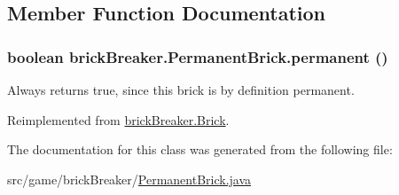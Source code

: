 \subsection{Member Function Documentation}
\hypertarget{classbrick_breaker_1_1_permanent_brick_a5095518bc2226f3257202d99e37d8ae4}{
\subsubsection[{permanent}]{\setlength{\rightskip}{0pt plus 5cm}boolean brickBreaker.PermanentBrick.permanent ()}}
\label{classbrick_breaker_1_1_permanent_brick_a5095518bc2226f3257202d99e37d8ae4}
Always returns true, since this brick is by definition permanent. 

Reimplemented from \hyperlink{classbrick_breaker_1_1_brick_a5fa03da94163b3dc3707c030e85a1405}{brickBreaker.Brick}.



The documentation for this class was generated from the following file:\begin{DoxyCompactItemize}
\item 
src/game/brickBreaker/\hyperlink{_permanent_brick_8java}{PermanentBrick.java}\end{DoxyCompactItemize}
